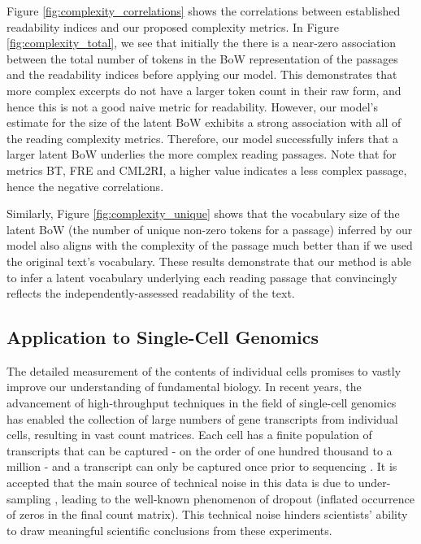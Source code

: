 \documentclass{article}
\theoremstyle{plain}
\theoremstyle{definition}
\theoremstyle{remark}
\begin{document}
Figure \ref{fig:complexity_correlations} shows the correlations between established readability indices and our proposed complexity metrics. In Figure \ref{fig:complexity_total}, we see that initially the there is a near-zero association between the total number of tokens in the BoW representation of the passages and the readability indices before applying our model. This demonstrates that more complex excerpts do not have a larger token count in their raw form, and hence this is not a good naive metric for readability. However, our model's estimate for the size of the latent BoW exhibits a strong association with all of the reading complexity metrics. Therefore, our model successfully infers that a larger latent BoW underlies the more complex reading passages. Note that for metrics BT, FRE and CML2RI, a higher value indicates a less complex passage, hence the negative correlations.

Similarly, Figure \ref{fig:complexity_unique} shows that the vocabulary size of the latent BoW (the number of unique non-zero tokens for a passage) inferred by our model also aligns with the complexity of the passage much better than if we used the original text's vocabulary. These results demonstrate that our method is able to infer a latent vocabulary underlying each reading passage that convincingly reflects the independently-assessed readability of the text.

\subsection{Application to Single-Cell Genomics}
\label{sec:sc}
The detailed measurement of the contents of individual cells promises to vastly improve our understanding of fundamental biology. In recent years, the advancement of high-throughput techniques in the field of single-cell genomics has enabled the collection of large numbers of gene transcripts from individual cells, resulting in vast count matrices. Each cell has a finite population of transcripts that can be captured - on the order of one hundred thousand to a million - and a transcript can only be captured once prior to sequencing \cite{de2019chromium}. It is accepted that the main source of technical noise in this data is due to under-sampling \cite{kuo_quantification_2022}, leading to the well-known phenomenon of dropout (inflated occurrence of zeros in the final count matrix). This technical noise hinders scientists' ability to draw meaningful scientific conclusions from these experiments.
\end{document}
